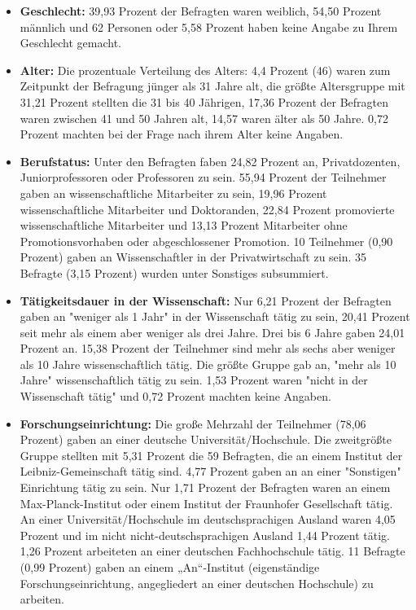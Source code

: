 \begin{itemize}
\item \textbf{Geschlecht:} 39,93 Prozent der Befragten waren weiblich, 54,50 Prozent männlich und 62 Personen oder 5,58 Prozent haben keine Angabe zu Ihrem Geschlecht gemacht. 
\item \textbf{Alter:} Die prozentuale Verteilung des Alters: 4,4 Prozent (46) waren zum Zeitpunkt der Befragung jünger als 31 Jahre alt, die größte Altersgruppe mit 31,21 Prozent stellten die 31 bis 40 Jährigen, 17,36 Prozent der Befragten waren zwischen 41 und 50 Jahren alt, 14,57 waren älter als 50 Jahre. 0,72 Prozent machten bei der Frage nach ihrem Alter keine Angaben. 
\item \textbf{Berufstatus:} Unter den Befragten faben 24,82 Prozent an, Privatdozenten, Juniorprofessoren oder Professoren zu sein. 55,94 Prozent der Teilnehmer gaben an wissenschaftliche Mitarbeiter zu sein, 19,96 Prozent wissenschaftliche Mitarbeiter und Doktoranden, 22,84 Prozent promovierte wissenschaftliche Mitarbeiter und 13,13 Prozent Mitarbeiter ohne Promotionsvorhaben oder abgeschlossener Promotion. 10 Teilnehmer (0,90 Prozent) gaben an Wissenschaftler in der Privatwirtschaft zu sein. 35 Befragte (3,15 Prozent) wurden unter Sonstiges subsummiert.
\item \textbf{Tätigkeitsdauer in der Wissenschaft:} Nur 6,21 Prozent der Befragten gaben an "weniger als 1 Jahr" in der Wissenschaft tätig zu sein, 20,41 Prozent seit mehr als einem aber weniger als drei Jahre. Drei bis 6 Jahre gaben 24,01 Prozent an. 15,38 Prozent der Teilnehmer sind mehr als sechs aber weniger als 10 Jahre wissenschaftlich tätig. Die größte Gruppe gab an, "mehr als 10 Jahre" wissenschaftlich tätig zu sein. 1,53 Prozent waren "nicht in der Wissenschaft tätig" und 0,72 Prozent machten keine Angaben.
\item \textbf{Forschungseinrichtung:} Die große Mehrzahl der Teilnehmer (78,06 Prozent) gaben an einer deutsche Universität/Hochschule. Die zweitgrößte Gruppe stellten mit 5,31 Prozent die 59 Befragten, die an einem Institut der Leibniz-Gemeinschaft tätig sind. 4,77 Prozent gaben an an einer "Sonstigen" Einrichtung tätig zu sein. Nur 1,71 Prozent der Befragten waren an einem Max-Planck-Institut oder einem Institut der Fraunhofer Gesellschaft tätig. An einer Universität/Hochschule im deutschsprachigen Ausland waren 4,05 Prozent und im nicht nicht-deutschsprachigen Ausland 1,44 Prozent tätig. 1,26 Prozent arbeiteten an einer deutschen Fachhochschule tätig. 11 Befragte (0,99 Prozent) gaben an einem „An“-Institut (eigenständige Forschungseinrichtung, angegliedert an einer deutschen Hochschule) zu arbeiten.
\end{itemize}

